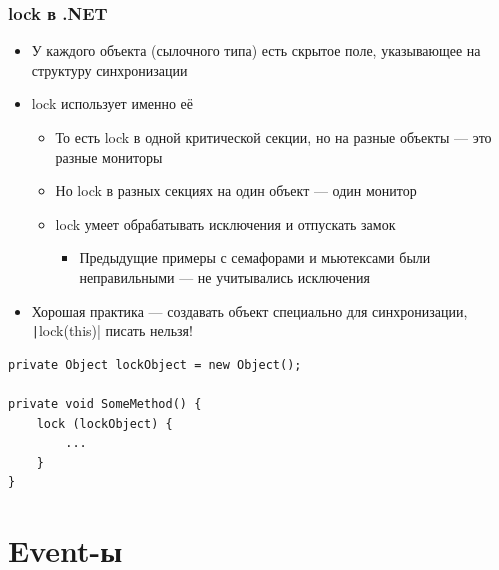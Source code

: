 \documentclass{../../slides-style}
\begin{document}
    \begin{frame}[fragile]
        \frametitle{lock в .NET}
        \begin{itemize}
            \item У каждого объекта (сылочного типа) есть скрытое поле, указывающее на структуру синхронизации
            \item lock использует именно её
            \begin{itemize}
                \item То есть lock в одной критической секции, но на разные объекты --- это разные мониторы
                \item Но lock в разных секциях на один объект --- один монитор
                \item lock умеет обрабатывать исключения и отпускать замок
                \begin{itemize}
                    \item Предыдущие примеры с семафорами и мьютексами были неправильными --- не учитывались исключения
                \end{itemize}
            \end{itemize}
            \item Хорошая практика --- создавать объект специально для синхронизации, \texttt|lock(this)| писать нельзя!
        \end{itemize}
        \begin{footnotesize}
            \begin{verbatim}
private Object lockObject = new Object();

private void SomeMethod() {
    lock (lockObject) {
        ...
    }
}
            \end{verbatim}
        \end{footnotesize}
    \end{frame}

    \section{Event-ы}
\end{document}
